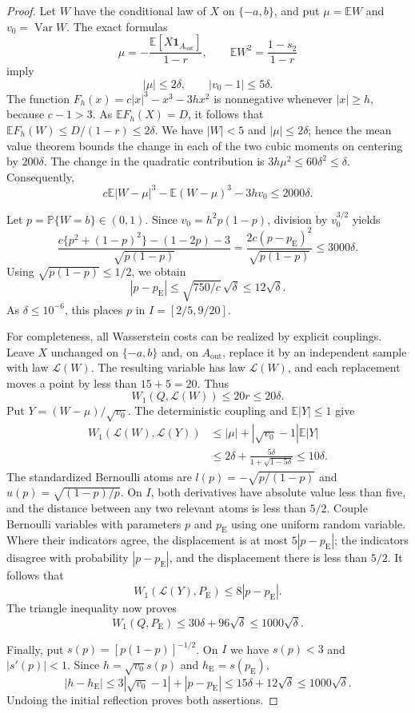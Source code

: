 \documentclass[aop]{imsart}
\theoremstyle{plain}
\theoremstyle{definition}
\theoremstyle{definition}
\newcommand{\PP}{\mathbb P}
\newcommand{\EE}{\mathbb E}
\newcommand{\pe}{p_{\mathrm E}}
\newcommand{\Pe}{P_{\mathrm E}}
\newcommand{\ind}{\mathbf 1}
\DeclareMathOperator{\Var}{Var}
\begin{document}
\begin{proof}
Let $W$ have the conditional law of $X$ on $\{-a,b\}$, and put
$\mu=\EE W$ and $v_0=\Var W$.  The exact formulas
\[
 \mu=-\frac{\EE[X\ind_{A_{\mathrm{out}}}]}{1-r},
 \qquad \EE W^2=\frac{1-s_2}{1-r}
\]
imply
\[
 |\mu|\le2\delta,\qquad |v_0-1|\le5\delta.
\]
The function
$F_h(x)=c|x|^3-x^3-3hx^2$ is nonnegative whenever $|x|\ge h$,
because $c-1>3$.  As $\EE F_h(X)=D$, it follows that
$\EE F_h(W)\le D/(1-r)\le2\delta$.
We have $|W|<5$ and $|\mu|\le2\delta$; hence the mean value
theorem bounds the change in each of the two cubic moments on
centering by $200\delta$.  The change in the quadratic
contribution is $3h\mu^2\le60\delta^2\le\delta$.
Consequently,
\[
 c\EE|W-\mu|^3-\EE(W-\mu)^3-3hv_0\le2000\delta.
\]

Let $p=\PP\{W=b\}\in(0,1)$.  Since
$v_0=h^2p(1-p)$, division by $v_0^{3/2}$ yields
\[
 \frac{c\{p^2+(1-p)^2\}-(1-2p)-3}{\sqrt{p(1-p)}}
 =\frac{2c(p-\pe)^2}{\sqrt{p(1-p)}}\le3000\delta.
\]
Using $\sqrt{p(1-p)}\le1/2$, we obtain
\[
 |p-\pe|\le\sqrt{750/c}\,\sqrt\delta\le12\sqrt\delta.
\]
As $\delta\le10^{-6}$, this places $p$ in
$I=[2/5,9/20]$.

For completeness, all Wasserstein costs can be realized by
explicit couplings.  Leave $X$ unchanged on $\{-a,b\}$ and,
on $A_{\mathrm{out}}$, replace it by an independent sample with
law $\mathcal L(W)$.  The resulting variable has law
$\mathcal L(W)$, and each replacement moves a point by less than
$15+5=20$.  Thus
\[
 W_1(Q,\mathcal L(W))\le20r\le20\delta.
\]
Put $Y=(W-\mu)/\sqrt{v_0}$.  The deterministic coupling and
$\EE|Y|\le1$ give
\[
 \begin{split}
 W_1(\mathcal L(W),\mathcal L(Y))
 &\le |\mu|+|\sqrt{v_0}-1|\EE|Y|\\
 &\le2\delta+\frac{5\delta}{1+\sqrt{1-5\delta}}
 \le10\delta.
 \end{split}
\]
The standardized Bernoulli atoms are
$l(p)=-\sqrt{p/(1-p)}$ and
$u(p)=\sqrt{(1-p)/p}$.  On $I$, both derivatives have absolute
value less than five, and the distance between any two relevant
atoms is less than $5/2$.  Couple Bernoulli variables with
parameters $p$ and $\pe$ using one uniform random variable.
Where their indicators agree, the displacement is at most
$5|p-\pe|$; the indicators disagree with probability
$|p-\pe|$, and the displacement there is less than $5/2$.
It follows that
\[
 W_1(\mathcal L(Y),\Pe)\le8|p-\pe|.
\]
The triangle inequality now proves
\[
 W_1(Q,\Pe)\le30\delta+96\sqrt\delta
 \le1000\sqrt\delta.
\]

Finally, put $s(p)=[p(1-p)]^{-1/2}$.  On $I$ we have $s(p)<3$
and $|s'(p)|<1$.  Since $h=\sqrt{v_0}s(p)$ and
$h_{\mathrm E}=s(\pe)$,
\[
 |h-h_{\mathrm E}|
 \le3|\sqrt{v_0}-1|+|p-\pe|
 \le15\delta+12\sqrt\delta
 \le1000\sqrt\delta.
\]
Undoing the initial reflection proves both assertions.
\end{proof}
\end{document}
